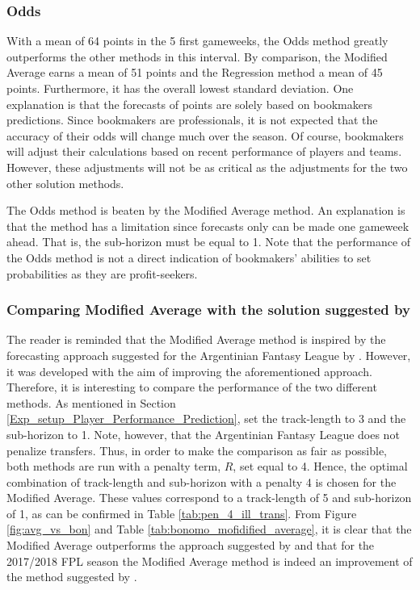 \subsubsection{Odds}

With a mean of 64 points in the 5 first gameweeks, the Odds method greatly outperforms the other methods in this interval. By comparison, the Modified Average earns a mean of 51 points and the Regression method a mean of 45 points. Furthermore, it has the overall lowest standard deviation. One explanation is that the forecasts of points are solely based on bookmakers predictions. Since bookmakers are professionals, it is not expected that the accuracy of their odds will change much over the season. Of course, bookmakers will adjust their calculations based on recent performance of players and teams. However, these adjustments will not be as critical as the adjustments for the two other solution methods.

\newpar

The Odds method is beaten by the Modified Average method. An explanation is that the method has a limitation since forecasts only can be made one gameweek ahead. That is, the sub-horizon must be equal to 1. Note that the performance of the Odds method is not a direct indication of bookmakers' abilities to set probabilities as they are profit-seekers. 


\subsubsection{Comparing Modified Average with the solution suggested by \cite{Bonomo}}



The reader is reminded that the Modified Average method is inspired by the forecasting approach suggested for the Argentinian Fantasy League by \cite{Bonomo}. However, it was developed with the aim of improving the aforementioned approach. Therefore, it is interesting to compare the performance of the two different methods. As mentioned in Section \ref{Exp_setup_Player_Performance_Prediction}, \cite{Bonomo} set the track-length to 3 and the sub-horizon to 1. Note, however, that the Argentinian Fantasy League does not penalize transfers. Thus, in order to make the comparison as fair as possible, both methods are run with a penalty term, $R$, set equal to 4. Hence, the optimal combination of track-length and sub-horizon with a penalty 4 is chosen for the Modified Average. These values correspond to a track-length of 5 and sub-horizon of 1, as can be confirmed in Table \ref{tab:pen_4_ill_trans}. From Figure \ref{fig:avg_vs_bon} and Table \ref{tab:bonomo_mofidified_average}, it is clear that the Modified Average outperforms the approach suggested by \cite{Bonomo} and that for the 2017/2018 FPL season the Modified Average method is indeed an improvement of the method suggested by \cite{Bonomo}.




